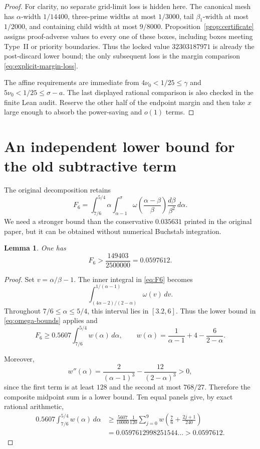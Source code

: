 \documentclass[10pt,reqno]{amsart}
\newcommand{\1}{\mathbf{1}}
\theoremstyle{plain}
\newtheorem{lemma}[theorem]{Lemma}
\theoremstyle{remark}
\begin{document}
\begin{proof}
For clarity, no separate grid-limit loss is hidden here.  The canonical
mesh has $\alpha$-width $1/14400$, three-prime widths at most $1/3000$,
tail $\beta_1$-width at most $1/2000$, and containing child width at most
$9/8000$.  Proposition~\ref{prop:certificate} assigns proof-adverse values
to every one of these boxes, including boxes meeting Type~II or priority
boundaries.  Thus the locked value $32303187971$ is already the
post-discard lower bound; the only subsequent loss is the margin comparison
\eqref{eq:explicit-margin-loss}.

The affine requirements are immediate from
$4\nu_0<1/25\le\gamma$ and
$5\nu_0<1/25\le\sigma-a$.  The last displayed rational comparison is also
checked in the finite Lean audit.  Reserve the other half of the endpoint
margin and then take $x$ large enough to absorb the power-saving and $o(1)$
terms.
\end{proof}

\section{An independent lower bound for the old subtractive term}

The original decomposition retains
\begin{equation}\label{eq:F6}
 F_6=\int_{7/6}^{5/4}\alpha
 \int_{\alpha-1}^{\sigma}
 \omega\left(\frac{\alpha-\beta}{\beta}\right)
 \frac{d\beta}{\beta^2}\,d\alpha.
\end{equation}
We need a stronger bound than the conservative $0.035631$ printed in the
original paper, but it can be obtained without numerical Buchstab
integration.

\begin{lemma}\label{lem:F6}
One has
\[
 F_6>\frac{149403}{2500000}=0.0597612.
\]
\end{lemma}

\begin{proof}
Set $v=\alpha/\beta-1$.  The inner integral in \eqref{eq:F6} becomes
\[
 \int_{(4\alpha-2)/(2-\alpha)}^{1/(\alpha-1)}\omega(v)\,dv.
\]
Throughout $7/6\le\alpha\le5/4$, this interval lies in $[3.2,6]$.
Thus the lower bound in \eqref{eq:omega-bounds} applies and
\[
 F_6\ge0.5607\int_{7/6}^{5/4}w(\alpha)\,d\alpha,
 \qquad
 w(\alpha)=\frac1{\alpha-1}+4-\frac6{2-\alpha}.
\]
\par\noindent Moreover,
\[
 w''(\alpha)=\frac2{(\alpha-1)^3}-\frac{12}{(2-\alpha)^3}>0,
\]
since the first term is at least $128$ and the second at most $768/27$.
Therefore the composite midpoint sum is a lower bound.  Ten equal panels
give, by exact rational arithmetic,
\begin{align*}
 0.5607\int_{7/6}^{5/4}w(\alpha)\,d\alpha
 &\ge \frac{5607}{10000}\frac1{120}
 \sum_{j=0}^{9}w\left(\frac76+\frac{2j+1}{240}\right)\\
 &=0.0597612998251544\ldots>0.0597612.
\end{align*}
\end{proof}
\end{document}
